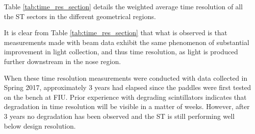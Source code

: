 Table \ref{tab:time_res_section} details the weighted average time resolution of all the ST sectors in the different geometrical regions.

It is clear from Table \ref{tab:time_res_section} that what is observed is that measurements made with beam data exhibit the same phenomenon of substantial improvement in light collection, and thus time resolution, as light is produced further downstream in the nose region.

When these time resolution measurements were conducted with data collected in Spring 2017, approximately 3 years had elapsed since the paddles were first tested on the bench at FIU.  Prior experience with degrading scintillators indicates that degradation in time resolution will be visible in a matter of weeks.  However, after 3 years no degradation has been observed and the ST is still performing well below design resolution.